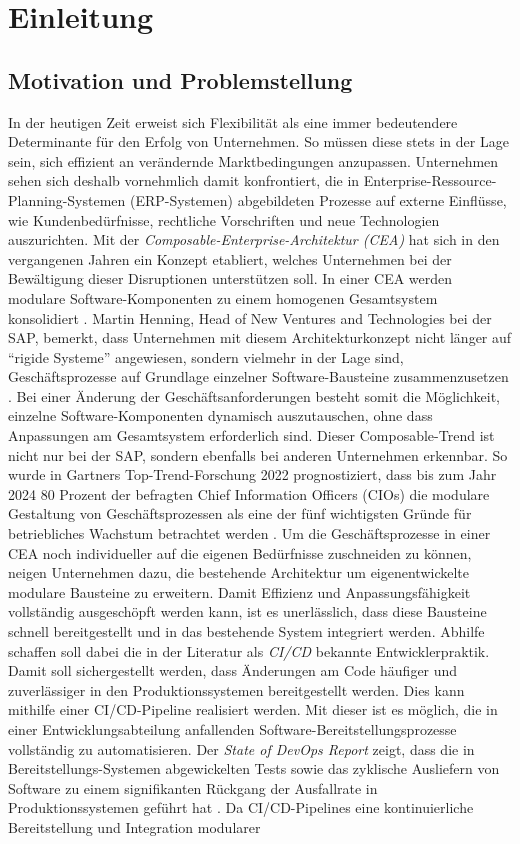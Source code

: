 \section{Einleitung}

\subsection{Motivation und Problemstellung}
In der heutigen Zeit erweist sich Flexibilität als eine immer bedeutendere Determinante für den Erfolg von Unternehmen. So müssen diese stets in der Lage sein, sich effizient an verändernde Marktbedingungen anzupassen. Unternehmen sehen sich deshalb vornehmlich damit konfrontiert, die in Enterprise-Ressource-Planning-Systemen (\acs{ERP}-Systemen) abgebildeten Prozesse auf externe Einflüsse, wie Kundenbedürfnisse, rechtliche Vorschriften und neue Technologien auszurichten. Mit der \textit{Composable-Enterprise-Architektur (CEA)} hat sich in den vergangenen Jahren ein Konzept etabliert, welches Unternehmen bei der Bewältigung dieser Disruptionen unterstützen soll. In einer CEA werden modulare Software-Komponenten zu einem homogenen Gesamtsystem konsolidiert \cite{.20230313}. Martin Henning, Head of New Ventures and Technologies bei der SAP, bemerkt, dass Unternehmen mit diesem Architekturkonzept nicht länger auf \enquote{rigide Systeme} angewiesen, sondern vielmehr in der Lage sind, Geschäftsprozesse auf Grundlage einzelner Software-Bausteine zusammenzusetzen \cite{Galer.20221019}. Bei einer Änderung der Geschäftsanforderungen besteht somit die Möglichkeit, einzelne Software-Komponenten dynamisch auszutauschen, ohne dass Anpassungen am Gesamtsystem erforderlich sind. Dieser Composable-Trend ist nicht nur bei der SAP, sondern ebenfalls bei anderen Unternehmen erkennbar. So wurde in Gartners Top-Trend-Forschung 2022 prognostiziert, dass bis zum Jahr 2024 80 Prozent der befragten Chief Information Officers (\acs{CIO}s) die modulare Gestaltung von Geschäftsprozessen als eine der fünf wichtigsten Gründe für betriebliches Wachstum betrachtet werden \cite{Gartner.20230408}. Um die Geschäftsprozesse in einer CEA noch individueller auf die eigenen Bedürfnisse zuschneiden zu können, neigen Unternehmen dazu, die bestehende Architektur um eigenentwickelte modulare Bausteine zu erweitern. Damit Effizienz und Anpassungsfähigkeit vollständig ausgeschöpft werden kann, ist es unerlässlich, dass diese Bausteine schnell bereitgestellt und in das bestehende System integriert werden. Abhilfe schaffen soll dabei die in der Literatur als \textit{\ac{CI/CD}} bekannte Entwicklerpraktik. Damit soll sichergestellt werden, dass Änderungen am Code häufiger und zuverlässiger in den Produktionssystemen bereitgestellt werden. Dies kann mithilfe einer CI/CD-Pipeline realisiert werden. Mit dieser ist es möglich, die in einer Entwicklungsabteilung anfallenden Software-Bereitstellungsprozesse vollständig zu automatisieren. Der \textit{State of DevOps Report} zeigt, dass die in Bereitstellungs-Systemen abgewickelten Tests sowie das zyklische Ausliefern von Software zu einem signifikanten Rückgang der Ausfallrate in Produktionssystemen geführt hat \cite[10]{GoogleCloud.20230313}. Da CI/CD-Pipelines eine kontinuierliche Bereitstellung und Integration modularer 